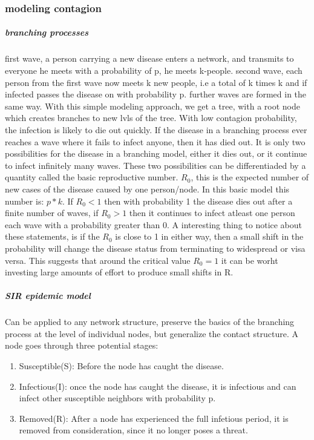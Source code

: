    \subsubsection{modeling contagion}
   \subparagraph{branching processes}
   first wave, a person carrying a new disease enters a network, and transmits to everyone he meets with a probability of p, he meets k-people.
second wave, each person from the first wave now meets k new people, i.e a total of k times k and if infected passes the disease on with probability p.
further waves are formed in the same way.
With this simple modeling approach, we get a tree, with a root node which creates branches to new
lvls of the tree. With low contagion probability, the infection is likely to die out quickly. 
If the disease in a branching process ever reaches a wave where it fails to infect anyone, then it has died out. It is only two possibilities for the disease in a branching model, 
either it dies out, or it continue to infect infinitely  many waves. These two possibilities can be
 differentiaded by a quantity called the basic reproductive number.  $R_{0}$, this is the expected
  number of new cases of the disease caused by one person/node. In this basic model this number is:
   $p*k$. If $R_{0}<1$ then with probability 1 the disease dies out after a finite number of waves, if $R_{0}>1$ then it continues to infect atleast one person each wave with a probability greater than 0.
   A interesting thing to notice about these statements, is if the $R_{0}$ is close to 1 in 
   either way, then a small shift in the probability will change the 
   disease status from terminating to widespread or visa versa. This suggests that around the critical value $R_{0}=1 $ it can be worht investing large amounts of effort to produce small shifts in R. 
\subparagraph{SIR epidemic model}
Can be applied to any network structure, preserve the basics of the branching process at the level of individual nodes, but generalize the contact structure. 
A node goes through three potential stages: \begin{enumerate}
\item Susceptible(S): Before the node has caught the disease.
\item Infectious(I): once the node has caught the disease, it is infectious and can infect other susceptible neighbors with probability p.
\item Removed(R): After a node has experienced the full infetious period, it is removed from consideration, since it no longer poses a threat.
\end{enumerate}

